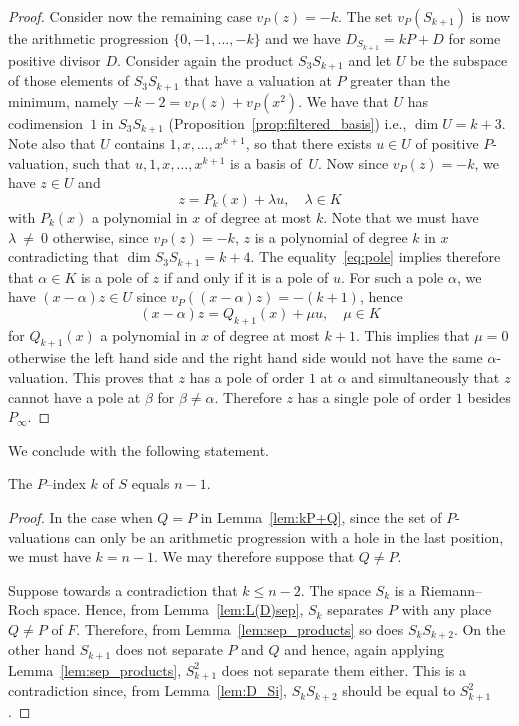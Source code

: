 \documentclass[ALCO,Unicode,ThmDefs]{cedram}
\renewcommand{\leq}{\leqslant}
\begin{document}
\begin{proof}
Consider now the remaining case $v_P(z)=-k$. The set $v_P(S_{k+1})$ is now the arithmetic progression $\{0,-1,\ldots, -k\}$ and we have $D_{S_{k+1}}= kP+D$ for some positive divisor $D$. Consider again the product $S_3S_{k+1}$ and let $U$ be the subspace of those elements of $S_3S_{k+1}$ that have a valuation { at $P$} greater than the minimum, namely $-k-2=v_P(z)+v_P(x^2)$. We have that $U$ has codimension~$1$ in $S_3S_{k+1}$ (Proposition~\ref{prop:filtered_basis}) i.e., $\dim U=k+3$. Note also that $U$ contains $1,x,\ldots,x^{k+1}$, so that there exists $u\in U$ of positive $P$-valuation, such that $u,1,x,\ldots,x^{k+1}$ is a basis of~$U$. Now since $v_P(z)=-k$, we have $z\in U$ and
\begin{equation}\label{eq:pole}
z= P_{k}(x)+\lambda u, \quad \lambda\in K
\end{equation}
with $P_{k}(x)$ a polynomial in $x$ of degree at most $k$. Note that we must have $\lambda~\neq~0$ otherwise, since $v_P(z)=-k$, $z$ is a polynomial of degree $k$ in $x$ contradicting that $\dim S_3S_{k+1}=k+4$. The equality~\eqref{eq:pole} implies therefore that $\alpha\in K$ is a pole of $z$ if and only if it is a pole of $u$. For such a pole $\alpha$, we have $(x-\alpha)z\in U$ since $v_P((x-\alpha)z)=-(k+1)$, hence
\[
(x-\alpha)z= Q_{k+1}(x) + \mu u, \quad \mu\in K
\]
for $Q_{k+1}(x)$ a polynomial in $x$ of degree at most $k+1$. This implies that $\mu=0$ otherwise the left hand side and the right hand side would not have the same $\alpha$-valuation. This proves that $z$ has a pole of order $1$ at $\alpha$ and simultaneously that $z$ cannot have a pole at $\beta$ for $\beta\neq \alpha$. Therefore $z$ has a single pole of order $1$ besides $P_\infty$.
\end{proof}

We conclude with the following statement.

\begin{prop}
The $P$--index $k$ of $S$ equals $n-1$.
\end{prop}

\begin{proof}
In the case when $Q=P$ in Lemma~\ref{lem:kP+Q}, since the set of $P$-valuations can only be an arithmetic progression with a hole in the last position, we must have $k=n-1$. We may therefore suppose that $Q\neq P$.

Suppose towards a contradiction that $k\leq n-2$. The space $S_k$ is a Riemann--Roch space. Hence, from Lemma~\ref{lem:L(D)sep}, $S_k$ separates $P$ with any place $Q\neq P$ of $F$. Therefore, from Lemma~\ref{lem:sep_products} so does $S_kS_{k+2}$. On the other hand $S_{k+1}$ does not separate $P$ and $Q$ and hence, again applying Lemma~\ref{lem:sep_products}, $S_{k+1}^2$ does not separate them either. This is a contradiction since, from Lemma~\ref{lem:D_Si}, $S_{k}S_{k+2}$ should be equal to $S_{k+1}^2$.
\end{proof}
\end{document}
